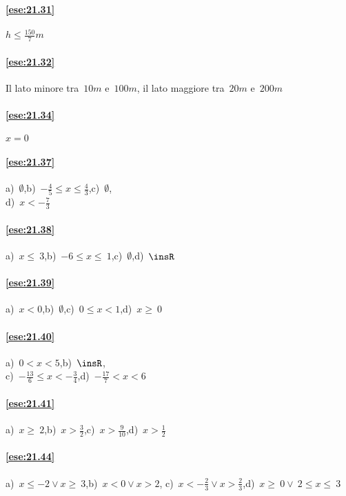 \begin{multicols}{2}
\paragraph{\ref{ese:21.31}} $h\le \frac{150}{7}m$

\paragraph{\ref{ese:21.32}} Il lato minore tra~$10\unit{m}$ e~$100\unit{m}$, il lato maggiore tra~$20\unit{m}$ e~$200\unit{m}$

\paragraph{\ref{ese:21.34}} $x = 0$

\paragraph{\ref{ese:21.37}} a)~$\emptyset $,\quad b)~$-{\frac{4}{5}}\le x\le\frac{4}{3}$,\quad c)~$\emptyset $,\quad
\protect\\ d)~$x<-{\frac{7}{3}}$

\paragraph{\ref{ese:21.38}} a)~$x\le~3$,\quad b)~$-6\le x\le~1$,\quad c)~$\emptyset $,\quad d)~$\insR$

\paragraph{\ref{ese:21.39}} a)~$x<0$,\quad b)~$\emptyset $,\quad c)~$0\le x<1$,\quad d)~$x\ge~0$

\paragraph{\ref{ese:21.40}} a)~$0<x<5$,\quad b)~$\insR$,\quad
\protect\\ c)~$-{\frac{13}{6}}\le x<-{\frac{3}{4}}$,\quad d)~$-{\frac{17}{7}}<x<6$

\paragraph{\ref{ese:21.41}} a)~$x\ge~2$,\quad b)~$x>\frac{3}{2}$,\quad c)~$x>\frac{9}{10}$,\quad d)~$x>\frac{1}{2}$

\paragraph{\ref{ese:21.44}} a)~$x\le -2\vee x\ge~3$,\quad b)~$x<0\vee x>2$,\quad
c)~$x<-{\frac{2}{3}}\vee x>\frac{2}{3}$,\quad d)~$x\ge~0\vee~2\le x\le~3$


\end{multicols}
